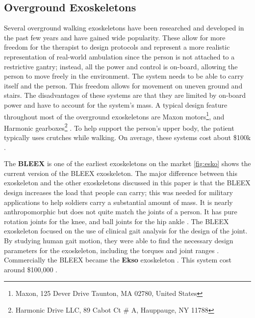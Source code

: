 \subsection{Overground Exoskeletons}

Several overground walking exoskeletons have been researched and developed in the past few years and have gained wide popularity. These allow for more freedom for the therapist to design protocols and represent a more realistic representation of real-world ambulation \cite{8110705} since the person is not attached to a restrictive gantry; instead, all the power and control is on-board, allowing the person to move freely in the environment. The system needs to be able to carry itself and the person. This freedom allows for movement on uneven ground and stairs. The disadvantages of these systems are that they are limited by on-board power and have to account for the system's mass.  A typical design feature throughout most of the overground exoskeletons are Maxon motors\footnote{Maxon, 125 Dever Drive Taunton, MA 02780, United States}, and Harmonic gearboxes\footnote{Harmonic Drive LLC, 89 Cabot Ct # A, Hauppauge, NY 11788} \cite{bortole2015h2} \cite{aliman2017design}. To help support the person's upper body, the patient typically uses crutches while walking. On average, these systems cost about \$100k \cite{rupal2017lower}.


The \textbf{BLEEX} is one of the earliest exoskeletons on the market \autoref{fig:esko} shows the current version of the BLEEX exoskeleton. The major difference between this exoskeleton and the other exoskeletons discussed in this paper is that the BLEEX design increases the load that people can carry; this was needed for military applications to help soldiers carry a substantial amount of mass. It is nearly anthropomorphic but does not quite match the joints of a person. It has pure rotation joints for the knee, and ball joints for the hip ankle \cite{chu2005biomimetic}\cite{zoss2006biomechanical}. The BLEEX exoskeleton focused on the use of clinical gait analysis for the design of the joint. By studying human gait motion, they were able to find the necessary design parameters for the exoskeleton, including the torques and joint ranges \cite{zoss2005mechanical}. Commercially the BLEEX became the \textbf{Ekso} exoskeleton \cite{zoss2016human}. This system cost around \$100,000 \cite{nichols_2018}. 


